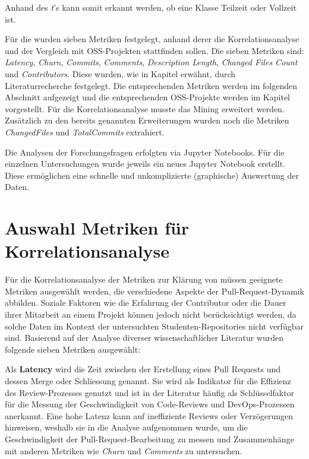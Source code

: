 Anhand des \textit{t}'s kann somit erkannt werden, ob eine Klasse Teilzeit oder Vollzeit ist.

Für die  wurden sieben Metriken festgelegt, anhand derer die Korrelationsanalyse und der Vergleich mit OSS-Projekten stattfinden sollen. Die sieben Metriken sind: \textit{Latency}, \textit{Churn}, \textit{Commits}, \textit{Comments}, \textit{Description Length}, \textit{Changed Files Count} und \textit{Contributors}. Diese wurden, wie in Kapitel  erwähnt, durch Literaturrecherche festgelegt. Die entsprechenden Metriken werden im folgenden Abschnitt  aufgezeigt und die entsprechenden OSS-Projekte werden im Kapitel  vorgestellt. Für die Korrelationsanalyse musste das Mining erweitert werden. Zusätzlich zu den bereits genannten Erweiterungen wurden noch die Metriken \textit{ChangedFiles} und \textit{TotalCommits} extrahiert.

Die Analysen der Forschungsfragen erfolgten via Jupyter Notebooks. Für die einzelnen Untersuchungen wurde jeweils ein neues Jupyter Notebook erstellt. Diese ermöglichen eine schnelle und unkomplizierte (graphische) Auswertung der Daten. \parencite{noauthor_repo-detectivesba-metric-analysis-scripts_nodate}


\section{Auswahl Metriken für Korrelationsanalyse}
\label{sec:MetrikenKorrelation}
Für die Korrelationsanalyse der Metriken zur Klärung von  müssen geeignete Metriken ausgewählt werden, die verschiedene Aspekte der Pull-Request-Dynamik abbilden. Soziale Faktoren wie die Erfahrung der Contributor oder die Dauer ihrer Mitarbeit an einem Projekt können jedoch nicht berücksichtigt werden, da solche Daten im Kontext der untersuchten Studenten-Repositories nicht verfügbar sind. Basierend auf der Analyse diverser wissenschaftlicher Literatur wurden folgende sieben Metriken ausgewählt:

Als \textbf{Latency} wird die Zeit zwischen der Erstellung eines Pull Requests und dessen Merge oder Schliessung genannt. Sie wird als Indikator für die Effizienz des Review-Prozesses genutzt und ist in der Literatur häufig als Schlüsselfaktor für die Messung der Geschwindigkeit von Code-Reviews und DevOps-Prozessen anerkannt. Eine hohe Latenz kann auf ineffiziente Reviews oder Verzögerungen hinweisen, weshalb sie in die Analyse aufgenommen wurde, um die Geschwindigkeit der Pull-Request-Bearbeitung zu messen und Zusammenhänge mit anderen Metriken wie \textit{Churn} und \textit{Comments} zu untersuchen. \parencite{yu_wait_2015}

